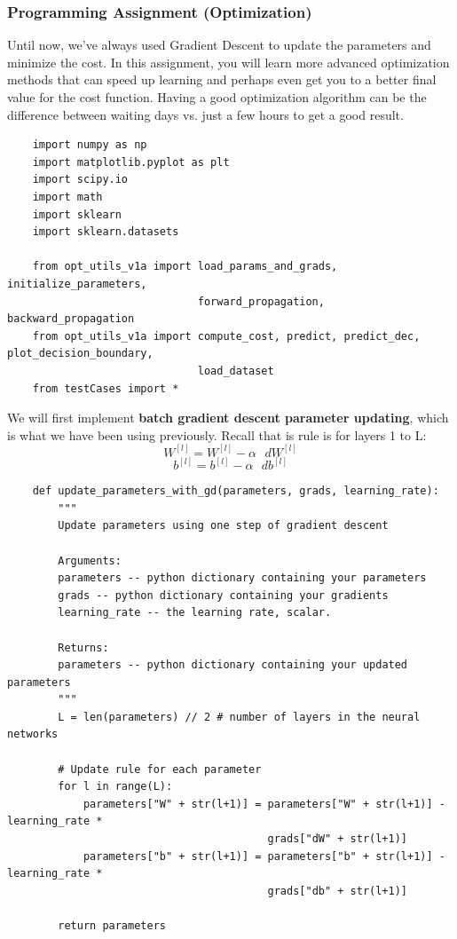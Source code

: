 \documentclass[11pt, a4paper]{article}
\begin{document}
\begin{spacing}{1.1}
	\subsubsection{Programming Assignment (Optimization)}
	Until now, we've always used Gradient Descent to update the parameters and minimize the cost. In this assignment, you will learn more advanced optimization methods that can speed up learning and perhaps even get you to a better final value for the cost function. Having a good optimization algorithm can be the difference between waiting days vs. just a few hours to get a good result. 
	\begin{lstlisting}
	import numpy as np
	import matplotlib.pyplot as plt
	import scipy.io
	import math
	import sklearn
	import sklearn.datasets
	
	from opt_utils_v1a import load_params_and_grads, initialize_parameters, 
	                          forward_propagation, backward_propagation
	from opt_utils_v1a import compute_cost, predict, predict_dec, plot_decision_boundary, 
	                          load_dataset
	from testCases import *	\end{lstlisting} \vspace*{1mm} 
	We will first implement \textbf{batch gradient descent parameter updating}, which is what we have been using previously. Recall that is rule is for layers 1 to L:
	$$ W^{[l]} = W^{[l]} - \alpha \text{ } dW^{[l]} $$
	$$ b^{[l]} = b^{[l]} - \alpha \text{ } db^{[l]} $$
	\begin{lstlisting}
	def update_parameters_with_gd(parameters, grads, learning_rate):
		"""
		Update parameters using one step of gradient descent
		
		Arguments:
		parameters -- python dictionary containing your parameters 
		grads -- python dictionary containing your gradients
		learning_rate -- the learning rate, scalar.
		
		Returns:
		parameters -- python dictionary containing your updated parameters 
		"""
		L = len(parameters) // 2 # number of layers in the neural networks
		
		# Update rule for each parameter
		for l in range(L):
			parameters["W" + str(l+1)] = parameters["W" + str(l+1)] - learning_rate * 
			                             grads["dW" + str(l+1)]
			parameters["b" + str(l+1)] = parameters["b" + str(l+1)] - learning_rate * 
			                             grads["db" + str(l+1)]
		
		return parameters \end{lstlisting} \newpage


\end{spacing}
\end{document}

